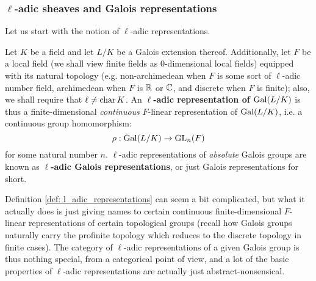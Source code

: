             \subsubsection{\texorpdfstring{$\ell$}{}-adic sheaves and Galois representations} \label{subsubsection: l_adic_sheaves}
                Let us start with the notion of $\ell$-adic representations. 
                \begin{definition} \label{def: l_adic_representations}
                    Let $K$ be a field and let $L/K$ be a Galois extension thereof. Additionally, let $F$ be a local field (we shall view finite fields as $0$-dimensional local fields) equipped with its natural topology (e.g. non-archimedean when $F$ is some sort of $\ell$-adic number field, archimedean when $F$ is $\mathbb{R}$ or $\mathbb{C}$, and discrete when $F$ is finite); also, we shall require that $\ell \not = \operatorname{char} K$. An \textbf{$\ell$-adic representation of $\mathrm{Gal}(L/K)$} is thus a finite-dimensional \textit{continuous} $F$-linear representation of $\mathrm{Gal}(L/K)$, i.e. a continuous group homomorphism:
                        $$\rho: \mathrm{Gal}(L/K) \to \operatorname{GL}_n(F)$$
                    for some natural number $n$. $\ell$-adic representations of \textit{absolute} Galois groups are known as \textbf{$\ell$-adic Galois representations}, or just Galois representations for short.
                \end{definition}
                \begin{remark}
                    Definition \ref{def: l_adic_representations} can seem a bit complicated, but what it actually does is just giving names to certain continuous finite-dimensional $F$-linear representations of certain topological groups (recall how Galois groups naturally carry the profinite topology which reduces to the discrete topology in finite cases). The category of $\ell$-adic representations of a given Galois group is thus nothing special, from a categorical point of view, and a lot of the basic properties of $\ell$-adic representations are actually just abstract-nonsensical. 
                \end{remark}

